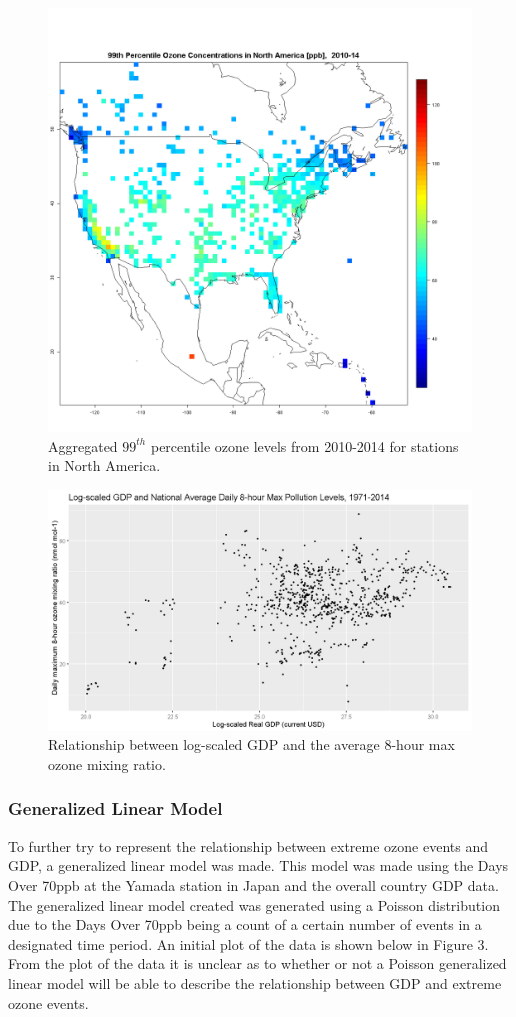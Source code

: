\documentclass[11pt, oneside]{article}
\theoremstyle{definition}
\begin{document}

\begin{figure}[ht]
    \centering
    \includegraphics[width=0.5\linewidth]{plots/na_2010-14.png}
    \caption{Aggregated $99^{th}$ percentile ozone levels from 2010-2014 for stations in North America.}
    \label{fig:na}
\end{figure}

\begin{figure}[ht]
    \centering
    \includegraphics[width=0.6\linewidth]{plots/gdp_vs_dma8.png}
    \caption{Relationship between log-scaled GDP and the average 8-hour max ozone mixing ratio.}
    \label{fig:na}
\end{figure}

\newpage

\subsubsection{Generalized Linear Model}
To further try to represent the relationship between extreme ozone events and GDP, a generalized linear model was made. This model was made using the Days Over 70ppb at the Yamada station in Japan and the overall country GDP data. The generalized linear model created was generated using a Poisson distribution due to the Days Over 70ppb being a count of a certain number of events in a designated time period. An initial plot of the data is shown below in Figure 3. From the plot of the data it is unclear as to whether or not a Poisson generalized linear model will be able to describe the relationship between GDP and extreme ozone events. 
\end{document}
